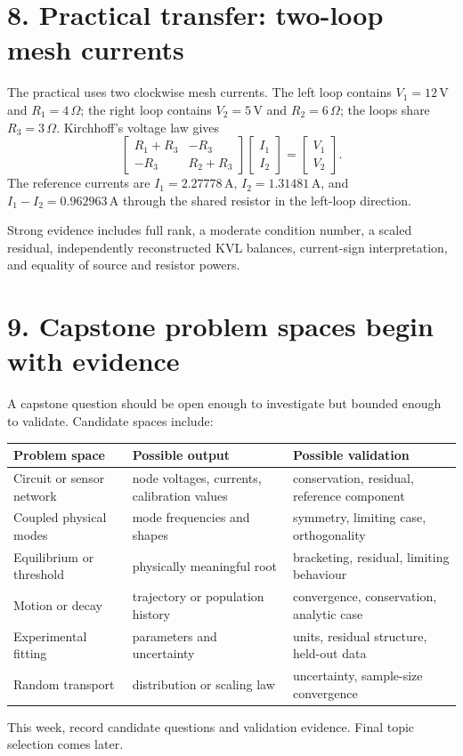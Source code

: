 \documentclass[11pt,a4paper]{article}
\begin{document}
\section*{8. Practical transfer: two-loop mesh currents}
The practical uses two clockwise mesh currents. The left loop contains $V_1=12\,\mathrm{V}$ and $R_1=4\,\Omega$; the right loop contains $V_2=5\,\mathrm{V}$ and $R_2=6\,\Omega$; the loops share $R_3=3\,\Omega$. Kirchhoff's voltage law gives
\begin{equation}
\begin{bmatrix}R_1+R_3&-R_3\\-R_3&R_2+R_3\end{bmatrix}
\begin{bmatrix}I_1\\I_2\end{bmatrix}
=\begin{bmatrix}V_1\\V_2\end{bmatrix}.
\end{equation}
The reference currents are $I_1=2.27778\,\mathrm{A}$, $I_2=1.31481\,\mathrm{A}$, and $I_1-I_2=0.962963\,\mathrm{A}$ through the shared resistor in the left-loop direction.

Strong evidence includes full rank, a moderate condition number, a scaled residual, independently reconstructed KVL balances, current-sign interpretation, and equality of source and resistor powers.

\section*{9. Capstone problem spaces begin with evidence}
A capstone question should be open enough to investigate but bounded enough to validate. Candidate spaces include:
\begin{center}
\small
\begin{tabular}{>{\raggedright\arraybackslash}p{.27\linewidth}>{\raggedright\arraybackslash}p{.29\linewidth}>{\raggedright\arraybackslash}p{.33\linewidth}}
\toprule
\textbf{Problem space} & \textbf{Possible output} & \textbf{Possible validation}\\ \midrule
Circuit or sensor network & node voltages, currents, calibration values & conservation, residual, reference component\\
Coupled physical modes & mode frequencies and shapes & symmetry, limiting case, orthogonality\\
Equilibrium or threshold & physically meaningful root & bracketing, residual, limiting behaviour\\
Motion or decay & trajectory or population history & convergence, conservation, analytic case\\
Experimental fitting & parameters and uncertainty & units, residual structure, held-out data\\
Random transport & distribution or scaling law & uncertainty, sample-size convergence\\ \bottomrule
\end{tabular}
\end{center}
This week, record candidate questions and validation evidence. Final topic selection comes later.
\end{document}
